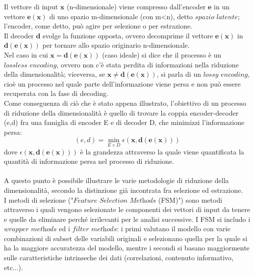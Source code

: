 Il vettore di input $\textbf{x}$ (n-dimensionale) viene compresso dall'encoder $\textbf{e}$ in un vettore $\textbf{e}(\textbf{x})$ di uno spazio m-dimensionale (con m<n), detto $\textit{spazio latente}$; l'encoder, come detto, può agire per selezione o per estrazione. \\
Il decoder $\textbf{d}$ svolge la funzione opposta, ovvero decomprime il vettore $\textbf{e}(\textbf{x})$ in $\textbf{d}(\textbf{e}(\textbf{x}))$ per tornare allo spazio originario n-dimensionale. \\
Nel caso in cui $\textbf{x} = \textbf{d}(\textbf{e}(\textbf{x}))$ (caso ideale) si dice che il processo è un $\textit{lossless encoding}$, ovvero non c'è stata perdita di informazioni nella riduzione della dimensionalità; viceversa, se $\textbf{x} \not= \textbf{d}(\textbf{e}(\textbf{x}))$, si parla di un $\textit{lossy encoding}$, cioè un processo nel quale parte dell'informazione viene persa e non può essere recuperata con la fase di decoding. \\
\newpage
Come conseguenza di ciò che è stato appena illustrato, l'obiettivo di un processo di riduzione della dimensionalità è quello di trovare la coppia encoder-decoder (e,d) fra una famiglia di encoder E e di decoder D, che minimizzi l'informazione persa:
\begin{equation}
(e,d) = \min_{E \times D} \epsilon (\textbf{x},\textbf{d}(\textbf{e}(\textbf{x})))
\end{equation}
dove $\epsilon (\textbf{x},\textbf{d}(\textbf{e}(\textbf{x})))$ è la grandezza attraverso la quale viene  quantificata la quantità di informazione persa nel processo di riduzione. \\ \\
A questo punto è possibile illustrare le varie metodologie di riduzione della dimensionalità, secondo la distinzione già incontrata fra selezione ed estrazione. \\
I metodi di selezione ("$\textit{Feature Selection Methods}$ (FSM)") sono metodi attraverso i quali vengono selezionate le componenti dei vettori di input da tenere e quelle da eliminare perché irrilevanti per le analisi successive. I FSM si includo i $\textit{wrapper methods}$ ed i $\textit{filter methods}$: i primi valutano il modello con varie combinazioni di subset delle variabili originali e selezionano quella per la quale si ha la maggiore accuratezza del modello, mentre i secondi si basano maggiormente sulle caratteristiche intrinseche dei dati (correlazioni, contenuto informativo, etc...). \\
